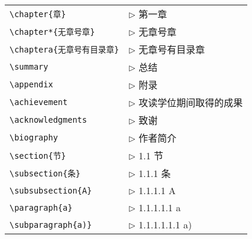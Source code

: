 \begin{tabular}{ll}
  \verb|\chapter{章}|              & $\triangleright$ 第一章 \\
  \verb|\chapter*{无章号章}|       & $\triangleright$ 无章号章 \\
  \verb|\chaptera{无章号有目录章}| & $\triangleright$ 无章号有目录章 \\
  \verb|\summary|                  & $\triangleright$ 总结\\
  \verb|\appendix|                 & $\triangleright$ 附录\\
  \verb|\achievement|              & $\triangleright$ 攻读学位期间取得的成果\\
  \verb|\acknowledgments|          & $\triangleright$ 致谢\\
  \verb|\biography|                & $\triangleright$ 作者简介\\
  \verb|\section{节}|              & $\triangleright$ 1.1 节\\
  \verb|\subsection{条}|           & $\triangleright$ 1.1.1 条\\
  \verb|\subsubsection{A}|         & $\triangleright$ 1.1.1.1 A\\
  \verb|\paragraph{a}|             & $\triangleright$ 1.1.1.1.1 a\\
  \verb|\subparagraph{a)}|         & $\triangleright$ 1.1.1.1.1.1 a)\\
\end{tabular}

